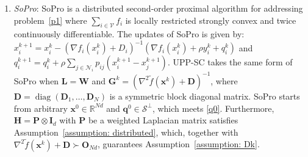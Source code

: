 \documentclass[12pt,draftcls,onecolumn]{IEEEtran}
\newcommand{\bx}{{\mathbf{x}}}
\newcommand{\bG}{{\mathbf{G}}}
\newcommand{\bL}{{\mathbf{L}}}
\newcommand{\bq}{{\mathbf{q}}}
\newcommand{\bI}{{\mathbf{I}}}
\newcommand{\bD}{{\mathbf{D}}}
\newcommand{\bW}{{\mathbf{W}}}
\begin{document}
\begin{enumerate}
        \item[3)] \textit{SoPro}: SoPro \cite{wu_second-order_2021} is a distributed second-order proximal algorithm for addressing problem~\eqref{p1} where $\sum_{i\in\mathcal{V}}f_i$ is locally restricted strongly convex and twice continuously differentiable. The updates of SoPro is given by: $x_i^{k+1}=x_i^k-(\nabla f_i(x_i^k)+D_i)^{-1}(\nabla f_i(x_i^k)+\rho y_i^k+q_i^k)$ and $q_i^{k+1}=q_i^k+\rho \sum_{j\in\mathcal{N}_i}p_{ij}(x_i^{k+1}-x_j^{k+1})$. UPP-SC takes the same form of SoPro when $\bL=\bW$ and $\bG^k=(\nabla^2 \tilde{f}(\bx^k)+\bD)^{-1}$, where $\bD=\operatorname{diag}(\bD_1,\dots,\bD_N)$ is a symmetric block diagonal matrix. SoPro starts from arbitrary $\bx^0\in\mathbb{R}^{Nd}$ and $\bq^0\in\mathcal{S}^{\bot}$, which meets \eqref{q0}. Furthermore, $\mathbf{H}=\mathbf{P}\otimes \bI_d$ with $\mathbf{P}$ be a weighted Laplacian matrix satisfies Assumption~\ref{assumption: distributed}, which, together with $\nabla^2 \tilde{f}(\bx^k)+\bD\succ \mathbf{O}_{Nd}$, guarantees Assumption~\ref{assumption: Dk}.
    \end{enumerate}
    
\end{document}
